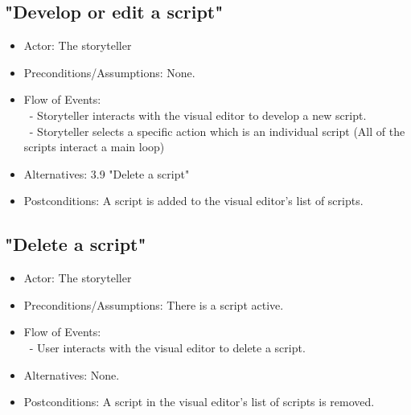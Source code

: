 \documentclass[12pt]{article}
\begin{document}
	\subsection{"Develop or edit a script"}
\begin{itemize}
		\item Actor: The storyteller
		\item Preconditions/Assumptions: None.
	\item Flow of Events: \\
	\	- Storyteller interacts with the visual editor to develop a new script. \\
	\   - Storyteller selects a specific action which is an individual script (All of the scripts interact a main loop) \\
	
	\item Alternatives: 3.9 "Delete a script"
	\item Postconditions: A script is added to the visual editor's list of scripts.
\end{itemize}

	\subsection{"Delete a script"}
\begin{itemize}
		\item Actor: The storyteller
		\item Preconditions/Assumptions: There is a script active.
	\item Flow of Events: \\
	\	- User interacts with the visual editor to delete a script.
	\item Alternatives: None.
	\item Postconditions: A script in the visual editor's list of scripts is removed.
\end{itemize}
	
\end{document}

